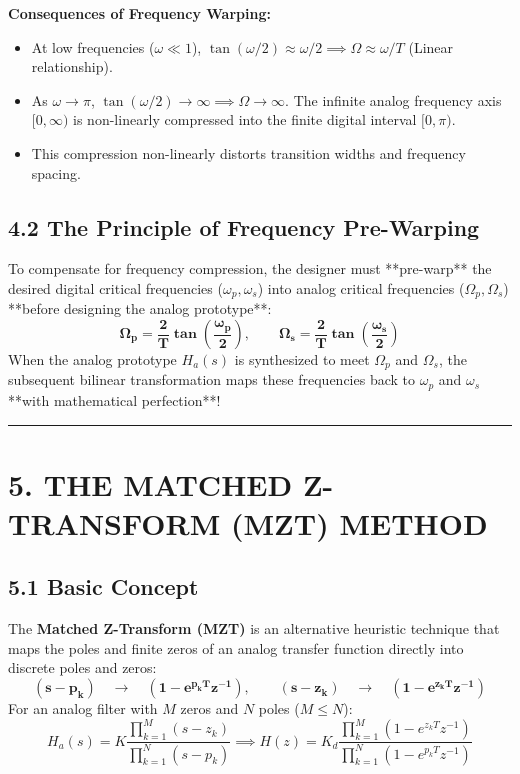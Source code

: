 \documentclass[11pt,a4paper]{article}
\begin{document}
\noindent\textbf{Consequences of Frequency Warping:}
\begin{itemize}
    \item At low frequencies ($\omega \ll 1$), $\tan(\omega/2) \approx \omega/2 \implies \Omega \approx \omega/T$ (Linear relationship).
    \item As $\omega \to \pi$, $\tan(\omega/2) \to \infty \implies \Omega \to \infty$. The infinite analog frequency axis $[0, \infty)$ is non-linearly compressed into the finite digital interval $[0, \pi)$.
    \item This compression non-linearly distorts transition widths and frequency spacing.
\end{itemize}

\subsection{4.2 The Principle of Frequency Pre-Warping}
To compensate for frequency compression, the designer must **pre-warp** the desired digital critical frequencies ($\omega_p, \omega_s$) into analog critical frequencies ($\Omega_p, \Omega_s$) **before designing the analog prototype**:
\begin{equation}
\mathbf{\Omega_p = \frac{2}{T} \tan\left(\frac{\omega_p}{2}\right)}, \qquad \mathbf{\Omega_s = \frac{2}{T} \tan\left(\frac{\omega_s}{2}\right)}
\label{eq:prewarping}
\end{equation}
When the analog prototype $H_a(s)$ is synthesized to meet $\Omega_p$ and $\Omega_s$, the subsequent bilinear transformation maps these frequencies back to $\omega_p$ and $\omega_s$ **with mathematical perfection**!

\noindent\rule{\textwidth}{0.5pt}

\section{5. THE MATCHED Z-TRANSFORM (MZT) METHOD}

\subsection{5.1 Basic Concept}
The \textbf{Matched Z-Transform (MZT)} is an alternative heuristic technique that maps the poles and finite zeros of an analog transfer function directly into discrete poles and zeros:
\begin{equation}
\mathbf{(s - p_k) \quad \longrightarrow \quad (1 - e^{p_k T} z^{-1})}, \qquad \mathbf{(s - z_k) \quad \longrightarrow \quad (1 - e^{z_k T} z^{-1})}
\end{equation}
For an analog filter with $M$ zeros and $N$ poles ($M \le N$):
\begin{equation}
H_a(s) = K \frac{\prod_{k=1}^M (s - z_k)}{\prod_{k=1}^N (s - p_k)} \implies H(z) = K_d \frac{\prod_{k=1}^M (1 - e^{z_k T} z^{-1})}{\prod_{k=1}^N (1 - e^{p_k T} z^{-1})}
\end{equation}
\end{document}
